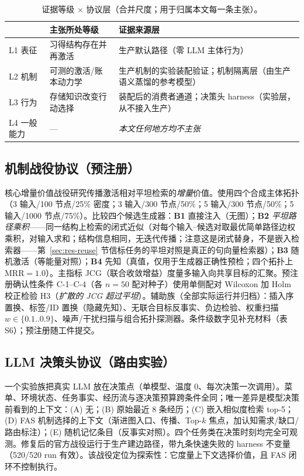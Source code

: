 \documentclass[10pt,a4paper]{ctexart}
\begin{document}
\begin{table}[t]
\centering\small
\caption{证据等级 $\times$ 协议层（合并尺度；用于归属本文每一条主张）。}
\label{tab:evidence}
\begin{tabular}{L{3.2cm}L{4.4cm}L{6.4cm}}
\toprule
 & \textbf{主张所处等级} & \textbf{证据来源层} \\
\midrule
L1 表征 & 习得结构存在并再激活 & 生产默认路径（零 LLM 主体行为） \\
L2 机制 & 可测的激活/账本动力学 & 生产机制的实验装配验证；机制隔离层（由生产语义蒸馏的参考模型） \\
L3 行为 & 存储知识改变行动选择 & 装配后的消费者通道；决策头 harness（实验层，从不接入生产） \\
L4 一般能力 & --- & \emph{本文任何地方均不主张} \\
\bottomrule
\end{tabular}
\end{table}

\subsection{机制战役协议（预注册）}
\label{sec:method-civ}
核心增量价值战役研究传播激活相对平坦检索的\emph{增量}价值。使用四个合成主体拓扑（3 输入/100 节点/25\% 密度；3 输入/300 节点/50\%；5 输入/300 节点/50\%；5 输入/1000 节点/75\%）。比较四个候选生成器：\textbf{B1} 直接注入（无图）；\textbf{B2} \emph{平坦路径乘积}——同一结构上检索的闭式近似（对每个输入--候选对取最优简单路径边权乘积，对输入求和；结构信息相同，无迭代传播；注意这是闭式替身，不是嵌入检索器——第~\ref{sec:res-reuse} 节信标任务的平坦对照是真正的句向量检索器）；\textbf{B3} 随机激活（等能量对照）；\textbf{B4} 先知（真值，仅用于生成器正确性预检；四个拓扑上 MRR${=}1.0$）。主指标 JCG（联合收敛增益）度量多输入向共享目标的汇聚。预注册确认性条件 C-1--C-4（各 $n{=}50$ 配对种子）使用单侧配对 Wilcoxon 加 Holm 校正检验 H3（\emph{扩散的 JCG 超过平坦}）。辅助族（全部实际运行并归档）：插入序置换、标签/ID 置换（隐藏先知）、无联合目标反事实、负边检验、权重扫描 $w\in\{0.1..0.9\}$、噪声/干扰扫描与组合拓扑探测器。条件级数字见补充材料（表 S6）；预注册随工件提交。

\subsection{LLM 决策头协议（路由实验）}
\label{sec:method-routing}
一个实验族把真实 LLM 放在决策点（单模型、温度 0、每次决策一次调用）。菜单、环境状态、任务事实、经历流与逐决策预算跨条件全同；唯一差异是模型决策前看到的上下文：(A) 无；(B) 原始最近 8 条经历；(C) 嵌入相似度检索 top-5；(D) FAS 机制选择的上下文（渐进图入口、传播、Top-$k$ 焦点，加认知需求/缺口/路由标注）；(E) 随机记忆条目（反事实对照）。四个任务类在决策时刻均完全可观测。修复后的官方战役运行于生产建边路径，带九条快速失败的 harness 不变量（520/520 run 有效）。该战役定位为探索性：它度量上下文选择价值，且 FAS 闭环不控制执行。
\end{document}
